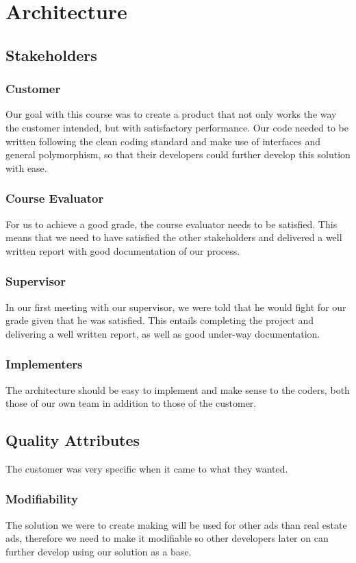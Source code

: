 \section{Architecture}

\subsection{Stakeholders}

\subsubsection{Customer}
Our goal with this course was to create a product that not only works the way the customer intended, but with satisfactory performance. Our code needed to be written following the clean coding standard and make use of interfaces and general polymorphism, so that their developers could further develop this solution with ease.

\subsubsection{Course Evaluator}
For us to achieve a good grade, the course evaluator needs to be satisfied. This means that we need to have satisfied the other stakeholders and delivered a well written report with good documentation of our process.

\subsubsection{Supervisor}
In our first meeting with our supervisor, we were told that he would fight for our grade given that he was satisfied. This entails completing the project and delivering a well written report, as well as good under-way documentation.

\subsubsection{Implementers}
The architecture should be easy to implement and make sense to the coders, both those of our own team in addition to those of the customer.

\subsection{Quality Attributes}
The customer was very specific when it came to what they wanted.
\subsubsection{Modifiability}
The solution we were to create making will be used for other ads than real estate ads, therefore we need to make it modifiable so other developers later on can further develop using our solution as a base.
